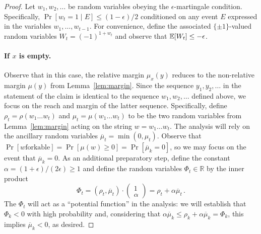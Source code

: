 \begin{proof}
  Let $w_1, w_2, \ldots$ be random variables obeying the
  $\epsilon$-martingale condition.  Specifically,
  $\Pr[w_t = 1 \mid E] \leq (1 - \epsilon)/2$ conditioned on any event
  $E$ expressed in the variables $w_1, \ldots, w_{t-1}$.  For
  convenience, define the associated $\{\pm1\}$-valued random
  variables $W_t = (-1)^{1+w_t}$ and observe that
  $\operatorname{\mathbb{E}}[W_t] \leq -\epsilon$.

\paragraph{If $x$ is empty.}
Observe that in this case, the relative margin $\mu_x(y)$ reduces to 
the non-relative margin $\mu(y)$ from Lemma~\ref{lem:margin}. 
Since the sequence $y_1, y_2, \ldots$ in the statement of the claim 
is identical to the sequence $w_1, w_2, \ldots$ defined above, 
we focus on the reach and margin of the latter sequence. 
Specifically, define $\rho_t = \rho(w_1 \ldots w_t)$ and
$\mu_t = \mu(w_1 \ldots w_t)$ to be the two random variables from
Lemma~\ref{lem:margin} acting on the string $w=w_1 \ldots w_t$. The
analysis will rely on the ancillary random variables
$\overline{\mu}_t = \min(0,\mu_t)$.  Observe that $\Pr[\text{$w$
  forkable}] = \Pr[\mu(w) \geq 0] = \Pr[\overline{\mu}_k = 0]$, so we
may focus on the event that $\overline{\mu}_k = 0$. As an additional
preparatory step, define the constant
$\alpha = (1+\epsilon)/(2\epsilon) \geq 1$ and define the random
variables $\Phi_t \in \mathbb{R}$ by the inner product
  \[
    \Phi_t = (\rho_t, \overline{\mu}_t) \cdot
    \left(\begin{array}{c} 1\\ \alpha\end{array}\right) = \rho_t +
    \alpha \overline{\mu}_t\,.
  \]
  The $\Phi_t$ will act as a ``potential function'' in the analysis:
  we will establish that $\Phi_k < 0$ with high probability and,
  considering that
  $\alpha\overline{\mu}_k \leq \rho_k + \alpha \overline{\mu}_k =
  \Phi_k$, this implies $\overline{\mu}_k < 0$, as desired.
  

\end{proof}
